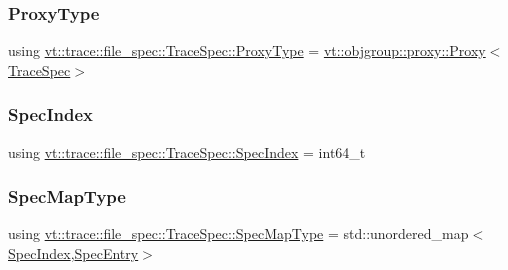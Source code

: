 \mbox{\label{structvt_1_1trace_1_1file__spec_1_1_trace_spec_a26160cff9bb5115866943ed823405f1f}} 
\subsubsection{\texorpdfstring{Proxy\+Type}{ProxyType}}
{\footnotesize\ttfamily using \hyperlink{structvt_1_1trace_1_1file__spec_1_1_trace_spec_a26160cff9bb5115866943ed823405f1f}{vt\+::trace\+::file\+\_\+spec\+::\+Trace\+Spec\+::\+Proxy\+Type} =  \hyperlink{structvt_1_1objgroup_1_1proxy_1_1_proxy}{vt\+::objgroup\+::proxy\+::\+Proxy}$<$\hyperlink{structvt_1_1trace_1_1file__spec_1_1_trace_spec}{Trace\+Spec}$>$}

\mbox{\label{structvt_1_1trace_1_1file__spec_1_1_trace_spec_a4dd2e8fb971930351812d0f286baece2}} 
\subsubsection{\texorpdfstring{Spec\+Index}{SpecIndex}}
{\footnotesize\ttfamily using \hyperlink{structvt_1_1trace_1_1file__spec_1_1_trace_spec_a4dd2e8fb971930351812d0f286baece2}{vt\+::trace\+::file\+\_\+spec\+::\+Trace\+Spec\+::\+Spec\+Index} =  int64\+\_\+t}

\mbox{\label{structvt_1_1trace_1_1file__spec_1_1_trace_spec_a155d6b881e8d69a4644823789788ce5c}} 
\subsubsection{\texorpdfstring{Spec\+Map\+Type}{SpecMapType}}
{\footnotesize\ttfamily using \hyperlink{structvt_1_1trace_1_1file__spec_1_1_trace_spec_a155d6b881e8d69a4644823789788ce5c}{vt\+::trace\+::file\+\_\+spec\+::\+Trace\+Spec\+::\+Spec\+Map\+Type} =  std\+::unordered\+\_\+map$<$\hyperlink{structvt_1_1trace_1_1file__spec_1_1_trace_spec_a4dd2e8fb971930351812d0f286baece2}{Spec\+Index},\hyperlink{structvt_1_1trace_1_1file__spec_1_1_trace_spec_1_1_spec_entry}{Spec\+Entry}$>$\hspace{0.3cm}{\ttfamily [private]}}



